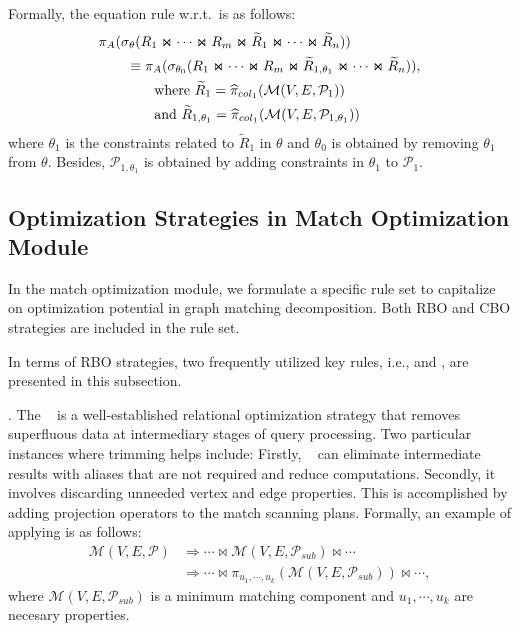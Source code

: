 Formally, the equation rule w.r.t.~\filterrule is as follows:
\begin{equation}
    \begin{split}
        & \pi_A(\sigma_{\theta}(R_1 \Join \cdots \Join R_m \Join \widetilde{R}_1 \Join \cdots \Join \widetilde{R}_n)) \\
        & \hspace*{2em} \equiv \pi_A(\sigma_{\theta_0}(R_1 \Join \cdots \Join R_m \Join \widetilde{R}_{1, \theta_1} \Join \cdots \Join \widetilde{R}_n)), \\
        & \hspace*{4em} \text{where } \widetilde{R}_{1} = \widehat{\pi}_{col_1}(\mathcal{M}(V, E, \mathcal{P}_1)) \\
        & \hspace*{4em} \text{and } \widetilde{R}_{1,\theta_1} = \widehat{\pi}_{col_1}(\mathcal{M}(V, E, \mathcal{P}_{1,\theta_1}))
    \end{split}
\end{equation}
where $\theta_1$ is the constraints related to $\widetilde{R}_1$ in $\theta$ and $\theta_0$ is obtained by removing $\theta_1$ from $\theta$.
Besides, $\mathcal{P}_{1,\theta_1}$ is obtained by adding constraints in $\theta_1$ to $\mathcal{P}_1$.


\subsection{Optimization Strategies in Match Optimization Module}

In the match optimization module, we formulate a specific rule set to capitalize on optimization potential in graph matching decomposition. 
Both RBO and CBO strategies are included in the rule set.

In terms of RBO strategies, two frequently utilized key rules, i.e., \trimrule and \fusionrule, are presented in this subsection.

\trimrule. 
The \trimrule~ is a well-established relational optimization strategy that removes superfluous data at intermediary stages of query processing. 
Two particular instances where trimming helps include: 
Firstly, \trimrule~ can eliminate intermediate results with aliases that are not required and reduce computations.
Secondly, it involves discarding unneeded vertex and edge properties.
This is accomplished by adding projection operators to the match scanning plans.
Formally, an example of applying \trimrule is as follows:
\begin{equation}
    \begin{split}
        \mathcal{M}(V, E, \mathcal{P}) & \Rightarrow \cdots \Join \mathcal{M}(V, E, \mathcal{P}_{sub}) \Join \cdots \\
        & \Rightarrow \cdots \Join \pi_{u_1, \cdots, u_k}(\mathcal{M}(V, E, \mathcal{P}_{sub})) \Join \cdots,
    \end{split} 
\end{equation}
where $\mathcal{M}(V, E, \mathcal{P}_{sub})$ is a minimum matching component and $u_1, \cdots, u_k$ are necesary properties.

